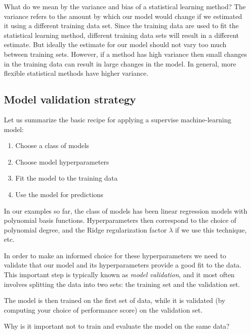 \documentclass[%
oneside,                 %
final,                   %
10pt]{article}
\newenvironment{question_mdfboxadmon}[1][]{
\begin{question_mdfboxmdframed}[frametitle=#1]
}
{
\end{question_mdfboxmdframed}
}
\begin{document}
What do we mean by the variance and bias of a statistical learning
method? The variance refers to the amount by which our model would change if we
estimated it using a different training data set. Since the training
data are used to fit the statistical learning method, different
training data sets  will result in a different estimate. But ideally the
estimate for our model should not vary too much between training
sets. However, if a method has high variance  then small changes in
the training data can result in large changes in the model. In general, more
flexible statistical methods have higher variance.


\subsection{Model validation strategy}

Let us summarize the basic recipe for applying a supervise machine-learning model:

\begin{enumerate}
 \item Choose a class of models

 \item Choose model hyperparameters

 \item Fit the model to the training data

 \item Use the model for predictions
\end{enumerate}

\noindent
In our examples so far, the class of models has been linear regression models with polynomial basis functions. Hyperparameters then correspond to the choice of polynomial degree, and the Ridge regularization factor $\lambda$ if we use this technique, etc. 

In order to make an informed choice for these hyperparameters we need to validate that our model and its hyperparameters provide a good fit to the data. This important step is typically known as \emph{model validation}, and it most often involves splitting the data into two sets: the training set and the validation set. 

The model is then trained on the first set of data, while it is validated (by computing your choice of performance score) on the validation set.


\begin{question_mdfboxadmon}[Question]
Why is it important not to train and evaluate the model on the same data?
\end{question_mdfboxadmon} %
\end{document}
